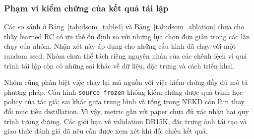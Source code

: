 \subsubsection{Phạm vi kiểm chứng của kết quả tái lập}

Các so sánh ở Bảng~\ref{tab:dsom_table4} và
Bảng~\ref{tab:dsom_ablation} chưa cho thấy learned RC có ưu
thế ổn định so với những lựa chọn đơn giản trong các lần chạy
của nhóm. Nhận xét này áp dụng cho những cấu hình đã chạy
với một random seed. Nhóm chưa thể tách riêng nguyên nhân
của các chênh lệch vì quá trình tái lập còn có những sai khác
về dữ liệu, đặc trưng và cách triển khai.

Nhóm cũng phân biệt việc chạy lại mã nguồn với việc kiểm
chứng đầy đủ mô tả phương pháp. Cấu hình \texttt{source\_frozen}
không kiểm chứng được quá trình học policy của tác giả;
sai khác giữa trung bình và tổng trong NEKD còn làm thay đổi
mục tiêu distillation. Vì vậy, metric gần với paper chưa đủ
xác nhận hai quy trình tương đương. Các giới hạn về validation
DB15K, đặc trưng ảnh tái tạo và giao thức đánh giá đã nêu
cần được xem xét khi đối chiếu kết quả.